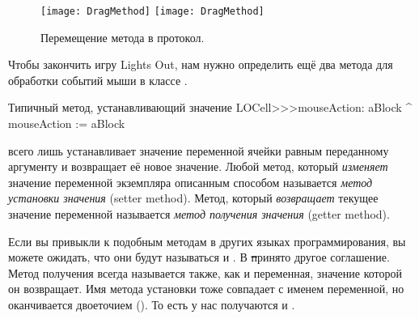 \documentclass[a4paper,10pt,twoside]{book}
\begin{document}
\begin{figure}[htbp]
   \centering
   \ifluluelse
		{\texttt{[image: DragMethod]} }
		{\texttt{[image: DragMethod]} }
   \caption{Перемещение метода в протокол.}
\end{figure}

Чтобы закончить игру Lights Out, нам нужно определить ещё два метода для обработки событий мыши в классе .
\begin{method}[mouseAction:]{Типичный метод, устанавливающий значение}
LOCell>>>mouseAction: aBlock
   ^ mouseAction := aBlock
\end{method}

 всего лишь устанавливает значение переменной ячейки  равным переданному аргументу и возвращает её новое значение.
Любой метод, который \emph{изменяет} значение переменной экземпляра описанным способом называется \emph{метод установки значения} (setter method). Метод, который \emph{возвращает} текущее значение переменной называется \emph{метод получения значения} (getter method).

Если вы привыкли к подобным методам в других языках программирования, вы можете ожидать, что они будут называться  и .
В \st принято другое соглашение.
Метод получения всегда называется также, как и переменная, значение которой он возвращает. Имя метода установки тоже совпадает с именем переменной, но оканчивается двоеточием (\ct{:}). То есть у нас получаются  и .
\end{document}
